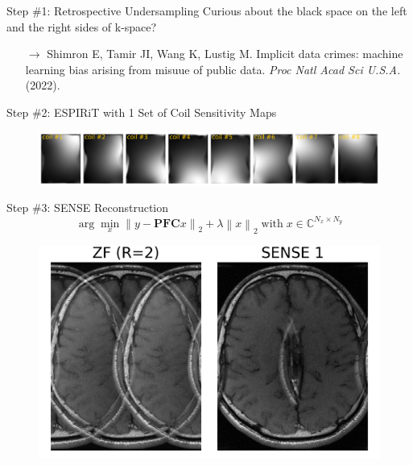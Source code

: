 \documentclass[aspectratio=169]{beamer}
\newcommand*{\norm}[1]{\left\lVert#1\right\rVert}
\newcommand{\argmin}{\arg\!\min}
\begin{document}
\begin{frame}{Step \#1: Retrospective Undersampling}
		Curious about the black space on the left and the right sides of k-space?
		\begin{itemize}
			\item [$\rightarrow$] Shimron E, Tamir JI, Wang K, Lustig M. Implicit data crimes: machine learning bias arising from misuue of public data. \textit{Proc Natl Acad Sci U.S.A.} (2022).
		\end{itemize}
	\end{frame}

	\begin{frame}{Step \#2: ESPIRiT with 1 Set of Coil Sensitivity Maps}
		\begin{figure}
			\centering
			\includegraphics[width=\textwidth]{figures/espirit_coil1.png}
		\end{figure}
	\end{frame}
	
	\begin{frame}{Step \#3: SENSE Reconstruction}
		\begin{equation}
			\argmin_x \norm{y - \mathbf{P} \mathbf{F} \mathbf{C} x}_2 + \lambda \norm{x}_2 \; \text{with} \; x \in \mathbb{C}^{N_x \times N_y}
		\end{equation}
		
		\begin{figure}
			\centering
			\includegraphics[height=0.75\textheight]{figures/espirit_sense1.png}
		\end{figure}
	\end{frame}
	
\end{document}
